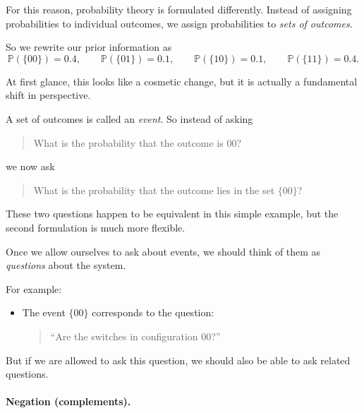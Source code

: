 \documentclass[11pt]{article}
\theoremstyle{remark}
\begin{document}
\vspace{2mm}

For this reason, probability theory is formulated differently. Instead of assigning probabilities to individual outcomes, we assign probabilities to \emph{sets of outcomes}.

So we rewrite our prior information as
\[
\mathbb P(\{00\})=0.4,\qquad
\mathbb P(\{01\})=0.1,\qquad
\mathbb P(\{10\})=0.1,\qquad
\mathbb P(\{11\})=0.4.
\]

At first glance, this looks like a cosmetic change, but it is actually a fundamental shift in perspective.

\vspace{2mm}

A set of outcomes is called an \emph{event}. So instead of asking

\begin{quote}
What is the probability that the outcome is \(00\)?
\end{quote}

we now ask

\begin{quote}
What is the probability that the outcome lies in the set \(\{00\}\)?
\end{quote}

These two questions happen to be equivalent in this simple example, but the second formulation is much more flexible.

\vspace{2mm}

Once we allow ourselves to ask about events, we should think of them as \emph{questions} about the system.

For example:
\begin{itemize}
    \item The event \(\{00\}\) corresponds to the question:
    \begin{quote}
    ``Are the switches in configuration \(00\)?''
    \end{quote}
\end{itemize}

But if we are allowed to ask this question, we should also be able to ask related questions.

\vspace{2mm}

\paragraph{Negation (complements).}
\end{document}
